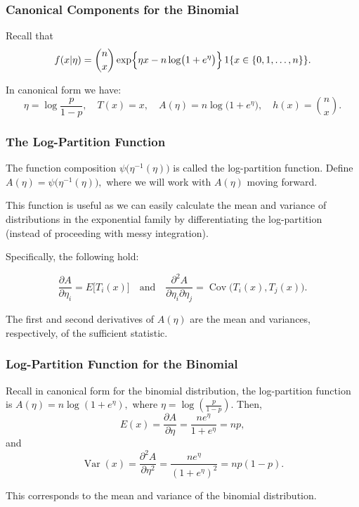 \documentclass{beamer}
\begin{document}
\begin{frame}
\frametitle{Canonical Components for the Binomial}

Recall that 
\[
f(x|\eta) = \binom{n}{x}\exp\Bigl\{\eta x - n\log\bigl(1+e^\eta\bigr)\Bigr\}\, 1\{x \in \{0,1,\dots,n\}\}.
\]

In canonical form we have:
\[
\eta = \log\frac{p}{1-p}, \quad T(x)=x,\quad A(\eta)= n\log\bigl(1+e^\eta\bigr),\quad h(x)= \binom{n}{x}.
\]
\end{frame}

\begin{frame}
\frametitle{The Log-Partition Function}

The function composition $\psi\bigl(\eta^{-1}(\eta)\bigr)$ is called the log-partition function. Define $A(\eta) = \psi\bigl(\eta^{-1}(\eta)\bigr),$ where we will work with $A(\eta)$ moving forward. 

\vspace*{1em}

This function is useful as we can easily calculate the mean and variance of distributions in the exponential family by differentiating the log-partition (instead of proceeding with messy integration).

\vspace*{1em}

Specifically, the following hold:

\[
\frac{\partial A}{\partial \eta_i} = E\bigl[T_i(x)\bigr] \quad \text{and} \quad \frac{\partial^2 A}{\partial \eta_i \partial \eta_j} = \operatorname{Cov}\bigl(T_i(x), T_j(x)\bigr).
\]

The first and second derivatives of $A(\eta)$ are the mean and variances, respectively, of the sufficient statistic. 
\end{frame}

\begin{frame}
\frametitle{Log-Partition Function for the Binomial}
Recall in canonical form for the binomial distribution, the log-partition function is $A(\eta) = n \log(1 + e^{\eta}),$ where $\eta = \log(\frac{p}{1-p}).$
\vspace*{1em}
Then,
\[
E(x) = \frac{\partial A}{\partial \eta} = \frac{n e^\eta}{1+e^\eta} = np,
\]
and
\[
\operatorname{Var}(x) = \frac{\partial^2 A}{\partial \eta^2} = \frac{n e^\eta}{(1+e^\eta)^2} = np(1-p).
\]
\vspace*{1em}

This corresponds to the mean and variance of the binomial distribution.
\end{frame}
\end{document}
